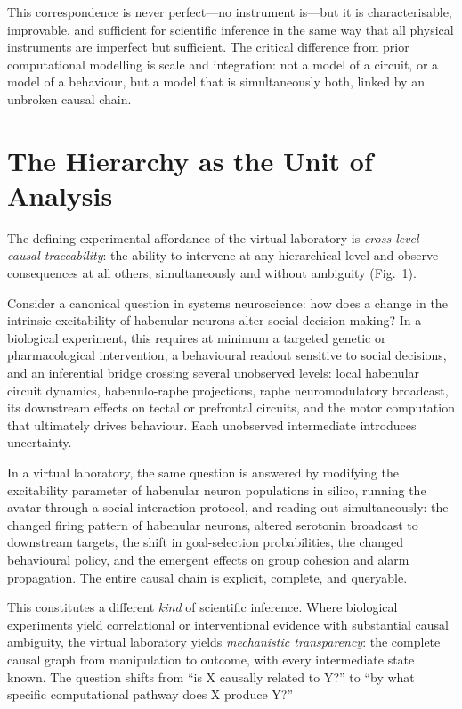 \documentclass[12pt,a4paper]{article}
\begin{document}
This correspondence is never perfect---no instrument is---but it is
characterisable, improvable, and sufficient for scientific inference
in the same way that all physical instruments are imperfect but
sufficient.
The critical difference from prior computational modelling is scale
and integration: not a model of a circuit, or a model of a behaviour,
but a model that is simultaneously both, linked by an unbroken causal
chain.


\section*{The Hierarchy as the Unit of Analysis}

The defining experimental affordance of the virtual laboratory is
\emph{cross-level causal traceability}: the ability to intervene at
any hierarchical level and observe consequences at all others,
simultaneously and without ambiguity (Fig.~1).

Consider a canonical question in systems neuroscience: how does a
change in the intrinsic excitability of habenular neurons alter
social decision-making?
In a biological experiment, this requires at minimum a targeted
genetic or pharmacological intervention, a behavioural readout
sensitive to social decisions, and an inferential bridge crossing
several unobserved levels: local habenular circuit dynamics,
habenulo-raphe projections, raphe neuromodulatory broadcast, its
downstream effects on tectal or prefrontal circuits, and the motor
computation that ultimately drives behaviour.
Each unobserved intermediate introduces uncertainty.

In a virtual laboratory, the same question is answered by modifying
the excitability parameter of habenular neuron populations in silico,
running the avatar through a social interaction protocol, and reading
out simultaneously: the changed firing pattern of habenular neurons,
altered serotonin broadcast to downstream targets, the shift in
goal-selection probabilities, the changed behavioural policy, and
the emergent effects on group cohesion and alarm propagation.
The entire causal chain is explicit, complete, and queryable.

This constitutes a different \emph{kind} of scientific inference.
Where biological experiments yield correlational or interventional
evidence with substantial causal ambiguity, the virtual laboratory
yields \emph{mechanistic transparency}: the complete causal graph from
manipulation to outcome, with every intermediate state known.
The question shifts from ``is X causally related to Y?'' to
``by what specific computational pathway does X produce Y?''
\end{document}
